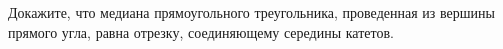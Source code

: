 \begin{ex}
	\begin{condition}
		Докажите, что медиана прямоугольного треугольника, проведенная из вершины прямого угла, равна отрезку, соединяющему середины катетов.
	\end{condition}
\end{ex}